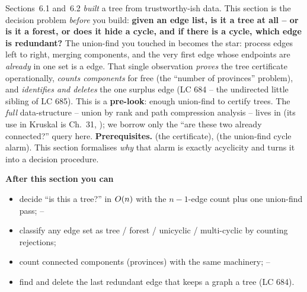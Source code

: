 \begin{topicintro}
Sections~6.1 and~6.2 \emph{built} a tree from trustworthy-ish data. This section is the decision
problem \emph{before} you build: \textbf{given an edge list, is it a tree at all -- or is it a
forest, or does it hide a cycle, and if there is a cycle, which edge is redundant?} The
union-find you touched in  becomes the star: process edges left to right, merging
components, and the very first edge whose endpoints are \emph{already} in one set is a
 edge. That single observation \emph{proves} the tree certificate operationally,
\emph{counts components} for free (the ``number of provinces'' problem), and \emph{identifies and
deletes} the one surplus edge (LC 684 -- the undirected little sibling of LC 685). This is a
\textbf{pre-look}: enough union-find to certify trees. The \emph{full} data-structure -- union by
rank and path compression analysis -- lives in  (its use in Kruskal is Ch.~31,
); we borrow only the
``are these two already connected?'' query here.
\textbf{Prerequisites.}  (the certificate),  (the union-find
cycle alarm). This section formalises \emph{why} that alarm is exactly acyclicity and turns it into
a decision procedure.

\textbf{After this section you can}
\begin{itemize}[nosep]
  \item decide ``is this a tree?'' in $O(n)$ with the $n-1$-edge count plus one union-find pass; \hfill{}--
  \item classify any edge set as tree / forest / unicyclic / multi-cyclic by counting rejections;  \hfill{}
  \item count connected components (provinces) with the same machinery;                              \hfill{}--
  \item find and delete the last redundant edge that keeps a graph a tree (LC 684).                 \hfill{}
\end{itemize}
\end{topicintro}

